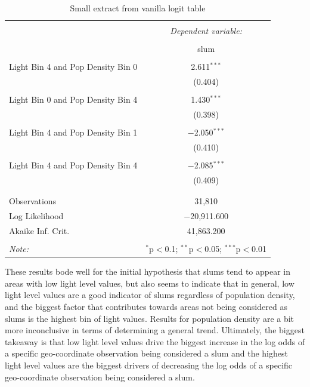 \begin{table}[!htbp] \centering 
  \caption{Small extract from vanilla logit table} 
  \label{Vanilla Regression Table} 
\begin{tabular}{@{\extracolsep{5pt}}lc} 
\\[-1.8ex]\hline 
\hline \\[-1.8ex] 
 & \multicolumn{1}{c}{\textit{Dependent variable:}} \\ 
\cline{2-2} 
\\[-1.8ex] & slum \\ 
\hline \\[-1.8ex] 
  Light Bin 4 and Pop Density Bin 0 & 2.611$^{***}$ \\ 
  & (0.404) \\ 
  & \\ 
 Light Bin 0 and Pop Density Bin 4 & 1.430$^{***}$ \\ 
  & (0.398) \\ 
  & \\ 
 Light Bin 4 and Pop Density Bin 1 & $-$2.050$^{***}$ \\ 
  & (0.410) \\ 
  & \\
 Light Bin 4 and Pop Density Bin 4 & $-$2.085$^{***}$ \\ 
  & (0.409) \\ 
  & \\ 
\hline \\[-1.8ex] 
Observations & 31,810 \\ 
Log Likelihood & $-$20,911.600 \\ 
Akaike Inf. Crit. & 41,863.200 \\ 
\hline 
\hline \\[-1.8ex] 
\textit{Note:}  & \multicolumn{1}{r}{$^{*}$p$<$0.1; $^{**}$p$<$0.05; $^{***}$p$<$0.01} \\ 
\end{tabular} 
\end{table} 

These results bode well for the initial hypothesis that slums tend to appear in areas with low light level values, but also seems to indicate that in general, low light level values are a good indicator of slums regardless of population density, and the biggest factor that contributes towards areas not being considered as slums is the highest bin of light values. Results for population density are a bit more inconclusive in terms of determining a general trend. Ultimately, the biggest takeaway is that low light level values drive the biggest increase in the log odds of a specific geo-coordinate observation being considered a slum and the highest light level values are the biggest drivers of decreasing the log odds of a specific geo-coordinate observation being considered a slum.

